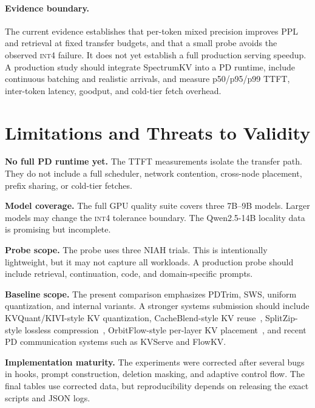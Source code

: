 \documentclass[11pt]{article}
\newcommand{\method}{SpectrumKV}
\newcommand{\niah}{NIAH}
\newcommand{\intiv}{\textsc{int4}}
\theoremstyle{plain}
\theoremstyle{definition}
\begin{document}
\paragraph{Evidence boundary.}
The current evidence establishes that per-token mixed precision improves PPL and retrieval at fixed transfer budgets, and that a small probe avoids the observed \intiv{} failure.  It does not yet establish a full production serving speedup.  A production study should integrate \method{} into a PD runtime, include continuous batching and realistic arrivals, and measure p50/p95/p99 TTFT, inter-token latency, goodput, and cold-tier fetch overhead.

\section{Limitations and Threats to Validity}
\label{sec:limitations}

\textbf{No full PD runtime yet.}  The TTFT measurements isolate the transfer path.  They do not include a full scheduler, network contention, cross-node placement, prefix sharing, or cold-tier fetches.

\textbf{Model coverage.}  The full GPU quality suite covers three 7B--9B models.  Larger models may change the \intiv{} tolerance boundary.  The Qwen2.5-14B locality data is promising but incomplete.

\textbf{Probe scope.}  The probe uses three \niah{} trials.  This is intentionally lightweight, but it may not capture all workloads.  A production probe should include retrieval, continuation, code, and domain-specific prompts.

\textbf{Baseline scope.}  The present comparison emphasizes PDTrim, SWS, uniform quantization, and internal variants.  A stronger systems submission should include KVQuant/KIVI-style KV quantization, CacheBlend-style KV reuse~\citep{cacheblend}, SplitZip-style lossless compression~\citep{splitzip}, OrbitFlow-style per-layer KV placement~\citep{orbitflow}, and recent PD communication systems such as KVServe and FlowKV.

\textbf{Implementation maturity.}  The experiments were corrected after several bugs in hooks, prompt construction, deletion masking, and adaptive control flow.  The final tables use corrected data, but reproducibility depends on releasing the exact scripts and JSON logs.
\end{document}
